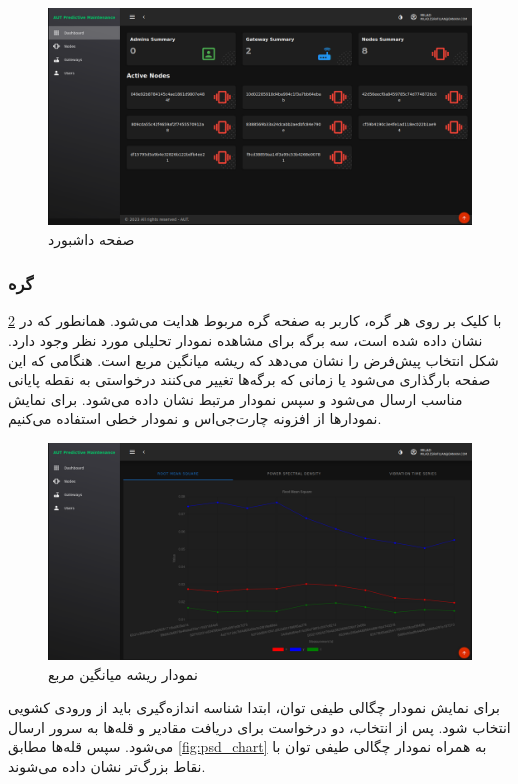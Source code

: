 \begin{figure}[!h]
\centering\includegraphics[scale=.38]{dashboard.png}
\caption{صفحه داشبورد}\label{fig:dashboard}
\end{figure}

\subsubsection{گره}

با کلیک بر روی هر گره، کاربر به صفحه گره مربوط هدایت می‌شود. همانطور که در \cref{fig:rms_chart} نشان داده شده است، سه برگه برای مشاهده نمودار تحلیلی مورد نظر وجود دارد. شکل انتخاب پیش‌فرض را نشان می‌دهد که ریشه میانگین مربع است. هنگامی که این صفحه بارگذاری می‌شود یا زمانی که برگه‌ها تغییر می‌کنند درخواستی به نقطه پایانی مناسب ارسال می‌شود و سپس نمودار مرتبط نشان داده می‌شود. برای نمایش نمودارها از افزونه چارت‌جی‌اس و نمودار خطی استفاده می‌کنیم.

\begin{figure}[!h]
\centering\includegraphics[scale=.38]{rms_chart.png}
\caption{نمودار ریشه میانگین مربع}\label{fig:rms_chart}
\end{figure}

برای نمایش نمودار چگالی طیفی توان، ابتدا شناسه اندازه‌گیری باید از ورودی کشویی انتخاب شود. پس از انتخاب، دو درخواست برای دریافت مقادیر  و قله‌ها به سرور ارسال می‌شود. سپس قله‌ها مطابق \cref{fig:psd_chart} به همراه نمودار چگالی طیفی توان با نقاط بزرگ‌تر نشان داده می‌شوند.

